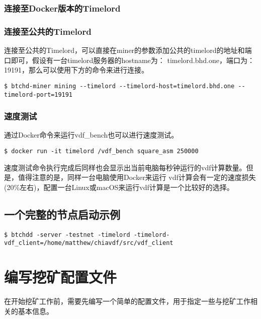 \subsubsection{连接至Docker版本的Timelord}
\subsubsection{连接至公共的Timelord}
\begin{flushleft}
    连接至公共的Timelord，可以直接在miner的参数添加公共的timelord的地址和端口即可，假设有一台timelord服务器的hostname为：
    timelord.bhd.one，端口为：19191，那么可以使用下方的命令来进行连接。
\end{flushleft}
\scriptsize
\begin{verbatim}
$ btchd-miner mining --timelord --timelord-host=timelord.bhd.one --timelord-port=19191
\end{verbatim}
\normalsize
\subsubsection{速度测试}
\begin{flushleft}
    通过Docker命令来运行vdf\_bench也可以进行速度测试。
\end{flushleft}
\scriptsize
\begin{verbatim}
$ docker run -it timelord /vdf_bench square_asm 250000
\end{verbatim}
\normalsize
\begin{flushleft}
    速度测试命令执行完成后同样也会显示出当前电脑每秒钟运行的vdf计算数量。但是，值得注意的是，同样一台电脑使用Docker来运行
    vdf计算会有一定的速度损失(20\%左右)，配置一台Linux或macOS来运行vdf计算是一个比较好的选择。
\end{flushleft}
\subsection{一个完整的节点启动示例}
\scriptsize
\begin{verbatim}
$ btchdd -server -testnet -timelord -timelord-vdf_client=/home/matthew/chiavdf/src/vdf_client
\end{verbatim}
\normalsize
\section{编写挖矿配置文件}
\begin{flushleft}
    在开始挖矿工作前，需要先编写一个简单的配置文件，用于指定一些与挖矿工作相关的基本信息。
\end{flushleft}
